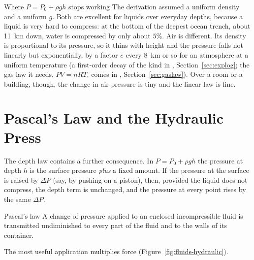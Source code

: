 \begin{remarkbox}{Where $P=P_0+\rho gh$ stops working}
The derivation assumed a uniform density and a uniform $g$. Both are excellent for liquids over everyday
depths, because a liquid is very hard to compress: at the bottom of the deepest ocean trench, about
\SI{11}{km} down, water is compressed by only about $5\%$. Air is different. Its density is proportional to
its pressure, so it thins with height and the pressure falls not linearly but exponentially, by a factor
$e$ every \SI{8}{km} or so for an atmosphere at a uniform temperature (a first-order decay of the kind in
, Section~\ref{sec:explog}; the gas law it needs, $PV=nRT$, comes in , Section~\ref{sec:gaslaw}). Over a
room or a building, though, the change in air pressure is tiny and the linear law is fine.
\end{remarkbox}

\section{Pascal's Law and the Hydraulic Press}\label{sec:pascal}

The depth law contains a further consequence. In $P=P_0+\rho gh$ the pressure at depth $h$ is the surface
pressure \emph{plus} a fixed amount. If the pressure at the surface is raised by $\Delta P$ (say, by
pushing on a piston), then, provided the liquid does not compress, the depth term is unchanged, and the
pressure at every point rises by the same $\Delta P$.

\begin{keybox}{Pascal's law}
A change of pressure applied to an enclosed incompressible fluid is transmitted undiminished to every part
of the fluid and to the walls of its container.
\end{keybox}

The most useful application multiplies force (Figure~\ref{fig:fluids-hydraulic}).

\begin{figure}[htbp]
\centering
{}
\end{figure}

